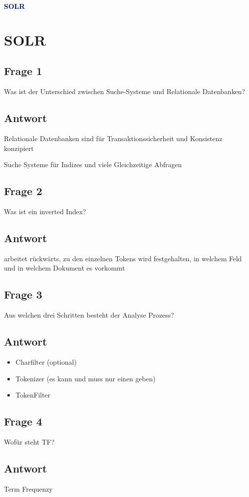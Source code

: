 \textbf{\textcolor{darkblue}{ SOLR}}~

\section*{SOLR}
\subsection*{Frage 1}
Was ist der Unterschied zwischen Suche-Systeme und Relationale Datenbanken?
\subsection*{Antwort}
Relationale Datenbanken sind für Transaktionssicherheit und Konsistenz konzipiert

Suche Systeme für Indizes und viele Gleichzeitige Abfragen 

\subsection*{Frage 2}
Was ist ein inverted Index?
\subsection*{Antwort}
arbeitet rückwärts, zu den einzelnen Tokens wird festgehalten, in welchem Feld und in welchem Dokument es vorkommt
\subsection*{Frage 3}
Aus welchen drei Schritten besteht der Analyse Prozess?
\subsection*{Antwort}
\begin{itemize}
	\item Charfilter (optional)
	\item Tokenizer (es kann und muss nur einen geben)
	\item TokenFilter
\end{itemize}
\subsection*{Frage 4}
Wofür steht TF?
\subsection*{Antwort}
Term Frequenzy
